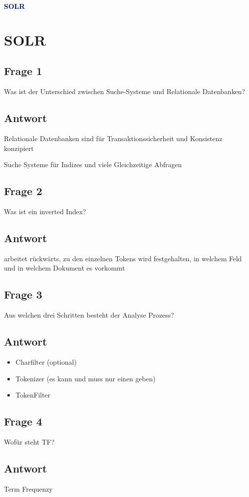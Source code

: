 \textbf{\textcolor{darkblue}{ SOLR}}~

\section*{SOLR}
\subsection*{Frage 1}
Was ist der Unterschied zwischen Suche-Systeme und Relationale Datenbanken?
\subsection*{Antwort}
Relationale Datenbanken sind für Transaktionssicherheit und Konsistenz konzipiert

Suche Systeme für Indizes und viele Gleichzeitige Abfragen 

\subsection*{Frage 2}
Was ist ein inverted Index?
\subsection*{Antwort}
arbeitet rückwärts, zu den einzelnen Tokens wird festgehalten, in welchem Feld und in welchem Dokument es vorkommt
\subsection*{Frage 3}
Aus welchen drei Schritten besteht der Analyse Prozess?
\subsection*{Antwort}
\begin{itemize}
	\item Charfilter (optional)
	\item Tokenizer (es kann und muss nur einen geben)
	\item TokenFilter
\end{itemize}
\subsection*{Frage 4}
Wofür steht TF?
\subsection*{Antwort}
Term Frequenzy
